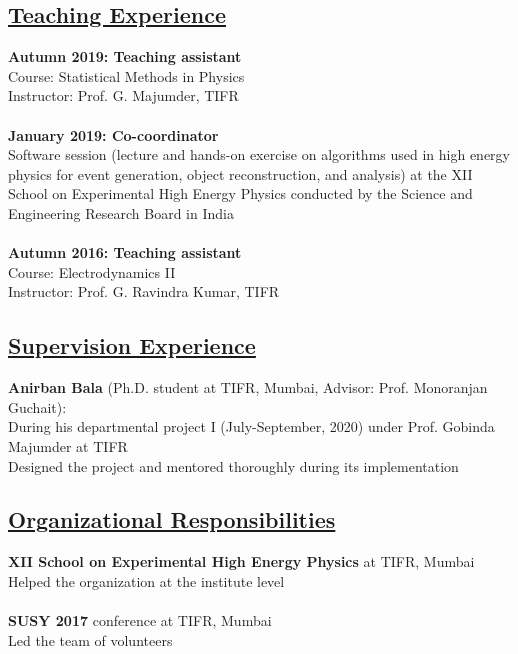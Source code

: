 \documentclass[a4paper,11pt]{article}
\begin{document}
\subsection*{\underline{Teaching Experience}}

\textbf{Autumn 2019: Teaching assistant}\\
Course: Statistical Methods in Physics\\
Instructor: Prof. G. Majumder, TIFR\\
\\
\textbf{January 2019: Co-coordinator}\\
Software session (lecture and hands-on exercise on algorithms used in high energy physics for event generation, object reconstruction, and analysis) 
at the XII School on Experimental High Energy Physics conducted by the Science and Engineering Research Board in India \\
\\
\textbf{Autumn 2016: Teaching assistant}\\
Course: Electrodynamics II\\
Instructor: Prof. G. Ravindra Kumar, TIFR\\

\subsection*{\underline{Supervision Experience}}

\textbf{Anirban Bala} (Ph.D. student at TIFR, Mumbai, Advisor: Prof. Monoranjan Guchait):\\
During his departmental project I (July-September, 2020) under Prof. Gobinda Majumder at TIFR \\
Designed the project and mentored thoroughly during its implementation\\

\subsection*{\underline{Organizational Responsibilities}}

\textbf{XII School on Experimental High Energy Physics} at TIFR, Mumbai\\
Helped the organization at the institute level\\
\\
\textbf{SUSY 2017} conference at TIFR, Mumbai\\
Led the team of volunteers \\
\end{document}
